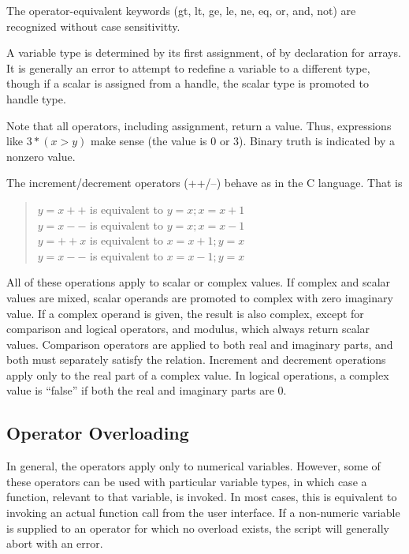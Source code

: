 The operator-equivalent keywords ({\vt gt}, {\vt lt}, {\vt ge}, {\vt
le}, {\vt ne}, {\vt eq}, {\vt or}, {\vt and}, {\vt not}) are
recognized without case sensitivitty.

A variable type is determined by its first assignment, of by
declaration for arrays.  It is generally an error to attempt to
redefine a variable to a different type, though if a scalar is
assigned from a handle, the scalar type is promoted to handle type.

Note that all operators, including assignment, return a value.  Thus,
expressions like {\vt $3*(x > y)$} make sense (the value is 0 or 3). 
Binary truth is indicated by a nonzero value.

The increment/decrement operators ({\vt ++/--}) behave as in the C
language.  That is
\begin{quote}
$y = x++$  is equivalent to $y = x; x = x + 1$\\
$y = x--$  is equivalent to $y = x; x = x - 1$\\
$y = ++x$  is equivalent to $x = x + 1; y = x$\\
$y = x--$  is equivalent to $x = x - 1; y = x$
\end{quote}

All of these operations apply to scalar or complex values.  If complex
and scalar values are mixed, scalar operands are promoted to complex
with zero imaginary value.  If a complex operand is given, the result
is also complex, except for comparison and logical operators, and
modulus, which always return scalar values.  Comparison operators are
applied to both real and imaginary parts, and both must separately
satisfy the relation.  Increment and decrement operations apply only
to the real part of a complex value.  In logical operations, a
complex value is ``false'' if both the real and imaginary parts are 0.

\subsection{Operator Overloading}

In general, the operators apply only to numerical variables.  However,
some of these operators can be used with particular variable types, in
which case a function, relevant to that variable, is invoked.  In most
cases, this is equivalent to invoking an actual function call from the
user interface.  If a non-numeric variable is supplied to an operator
for which no overload exists, the script will generally abort with an
error.

